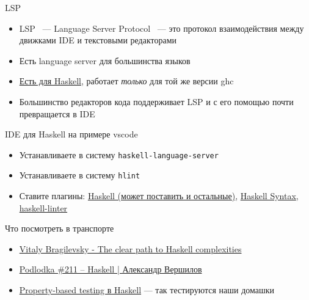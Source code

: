     \begin{frame}{LSP}
        \begin{itemize}
            \item LSP ~--- Language Server Protocol ~--- это протокол взаимодействия между движками IDE и текстовыми редакторами
            \item Есть language server для большинства языков
            \item \href{https://github.com/haskell/haskell-language-server/releases}{\color{blue}Есть для Haskell}, работает \emph{только} для той же версии ghc
            \item Большинство редакторов кода поддерживает LSP и с его помощью почти превращается в IDE
        \end{itemize}
        \begin{block}{IDE для Haskell на примере vscode}
            \begin{itemize}
                \item Устанавливаете в систему \texttt{haskell-language-server}
                \item Устанавливаете в систему \texttt{hlint}
                \item Ставите плагины: \href{https://marketplace.visualstudio.com/items?itemName=haskell.haskell}{\color{blue} Haskell (может поставить и остальные)}, \href{https://marketplace.visualstudio.com/items?itemName=justusadam.language-haskell}{\color{blue} Haskell Syntax},
                \href{https://marketplace.visualstudio.com/items?itemName=hoovercj.haskell-linter}{\color{blue} haskell-linter}
            \end{itemize}
        \end{block}
    \end{frame}


    \begin{frame}{Что посмотреть в транспорте}
        \begin{itemize}
            \item \href{https://youtu.be/n3H_YipBDrY?si=s1_yS-4r8JcZiuUi}{\color{blue} Vitaly Bragilevsky - The clear path to Haskell complexities}
            \item \href{https://youtu.be/sGFdbpGamWk}{\color{blue} Podlodka \#211 – Haskell | Александр Вершилов}
            \item \href{https://youtu.be/ndfLLz-wehE?si=A53s_VYg-UWJVWkW}{\color{blue}  Property-based testing в Haskell} --- так тестируются наши домашки
        \end{itemize}
    \end{frame}

